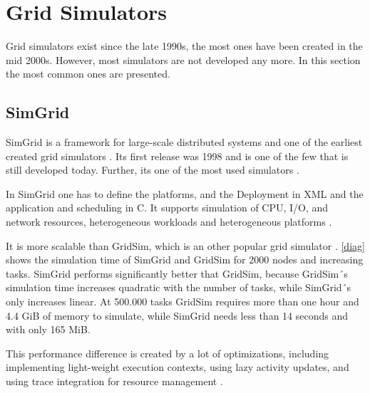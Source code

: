 \section{Grid Simulators}
Grid simulators exist since the late 1990s, the most ones have been created in the mid 2000s. However, most simulators are not developed any more. In this section the most common ones are presented.

\subsection{SimGrid}
\label{simgrid}
SimGrid is a framework for large-scale distributed systems and one of the earliest created grid simulators \cite{simgrid_update}. Its first release was 1998 and is one of the few that is still developed today.
Further, its one of the most used simulators \cite{simgrid_update}.

In SimGrid one has to define the platforms, and the Deployment in XML and the application and scheduling in C. It supports simulation of CPU, I/O, and network resources, heterogeneous workloads and heterogeneous platforms \cite{simgrid_update}.

It is more scalable than GridSim, which is an other popular grid simulator \cite{simgrid_update}.
\ref{diag} shows the simulation time of SimGrid and GridSim for 2000 nodes and increasing tasks.
SimGrid performs significantly better that GridSim, because GridSim´s simulation time increases quadratic with the number of tasks, while SimGrid´s only increases linear. At 500.000 tasks GridSim requires more than one hour and 4.4 GiB of memory to simulate, while SimGrid needs less than 14 seconds and with only 165 MiB.

This performance difference is created by a lot of optimizations, including implementing light-weight execution contexts, using lazy activity updates, and using trace integration for resource management \cite{simgrid_update}.

\begin{center}

\end{center}


